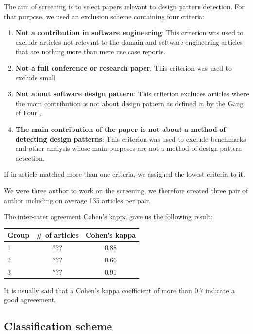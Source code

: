 \documentclass[letterpaper, 10 pt, conference]{ieeeconf}  %
\begin{document}
The aim of screening is to select papers relevant to design pattern detection.
For that purpose, we used an exclusion scheme containing four criteria:

\begin{enumerate}
  \item \textbf{Not a contribution in software engineering}: 
    This criterion was used to exclude articles not relevant to the domain and
    software engineering articles that are nothing more than mere use case
    reports.
  \item \textbf{Not a full conference or research paper},
    This criterion was used to exclude small
  \item \textbf{Not about software design pattern}:
    This criterion excludes articles where the main contribution is not about
    design pattern as defined in by the Gang of Four ,
  \item \textbf{The main contribution of the paper is not about a method of detecting design patterns}:
    This criterion was used to exclude benchmarks and other analysis whose main
    purposes are not a method of design pattern detection.
\end{enumerate}

If in article matched more than one criteria, we assigned the lowest criteria
to it.

We were three author to work on the screening, we therefore created three pair
of author including on average 135 articles per pair.

The inter-rater agreement Cohen's kappa gave us the following result:

\begin{center}
  \begin{tabular}{ lcc }
    \bf Group & \bf \# of articles & \bf Cohen's kappa \\
    \hline {}
    1 & ??? & 0.88 \\
    2 & ??? & 0.66 \\
    3 & ??? & 0.91 \\
  \end{tabular}
\end{center}

It is usually said that a Cohen's kappa coefficient of more than $0.7$ indicate
a good agreeement.%

\subsection{Classification scheme}
\end{document}
